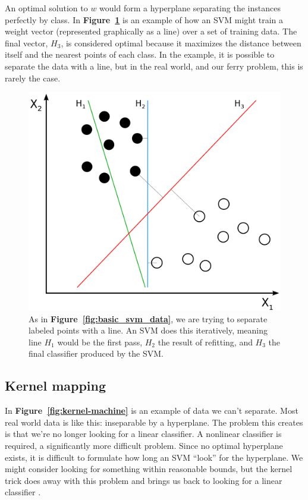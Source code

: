 \documentclass[11pt]{article} %
\begin{document}
An optimal solution to $w$ would form a hyperplane separating the instances
perfectly by class. In \textbf{Figure~\ref{fig:training_hyperplanes}} is an 
example of how an SVM might train a weight vector (represented graphically as
a line) over a set of training data. The final vector, $H_3$, is considered 
optimal because it maximizes the distance between itself and the nearest points
of each class. In the example, it is possible to separate the data with a 
line, but in the real world, and our ferry problem, this is rarely the case.

\begin{figure}[h]
  \centering
  \includegraphics[scale=.5]{images/Svm_separating_hyperplanes.png}
  \caption{As in \textbf{Figure~\ref{fig:basic_svm_data}}, we are trying to separate
    labeled points with a line. An SVM does this iteratively, meaning line $H_1$
    would be the first pass, $H_2$ the result of refitting, and $H_3$ the final 
    classifier produced by the SVM.}
  \label{fig:training_hyperplanes}
\end{figure}

\subsection{Kernel mapping}
\label{sec:kernels}
In \textbf{Figure~\ref{fig:kernel-machine}} is an example of data we can't separate.
Most real world data is like this: inseparable by a hyperplane. The problem this
creates is that we're no longer looking for a linear classifier. A nonlinear 
classifier is required, a significantly more difficult problem. Since no optimal
hyperplane exists, it is difficult to formulate how long an SVM ``look'' for the
hyperplane. We might consider looking for something within reasonable bounds, but 
the kernel trick does away with this problem and brings us back to looking for
a linear classifier \cite{aizerman1964theoretical}.
\end{document}

